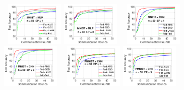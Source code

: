 \documentclass[nohyperref]{article}
\begin{document}
\begin{figure}[t]
    \begin{center}
        \mbox{
        \hspace{-0.1in}\includegraphics[width=0.25\textwidth]{new_fmnist_mnist_fig/mnist_testerror_mlp_ep1_iid1_reddi.pdf}
                \hspace{-0.1in}\includegraphics[width=0.25\textwidth]{new_fmnist_mnist_fig/mnist_testerror_mlp_ep3_iid1_reddi.pdf}
                }
        \mbox{
                \hspace{-0.1in}\includegraphics[width=0.25\textwidth]{new_fmnist_mnist_fig/mnist_testerror_cnn_ep1_iid1_reddi.pdf}
                \hspace{-0.1in}\includegraphics[width=0.25\textwidth]{new_fmnist_mnist_fig/mnist_testerror_cnn_ep3_iid1_reddi.pdf}
                }
        \mbox{
                \hspace{-0.1in}\includegraphics[width=0.25\textwidth]{new_fmnist_mnist_fig/fmnist_testerror_cnn_ep1_iid1_reddi.pdf}
        \hspace{-0.1in}\includegraphics[width=0.25\textwidth]{new_fmnist_mnist_fig/fmnist_testerror_cnn_ep3_iid1_reddi.pdf}
}
\end{center}
\end{figure}
\end{document}
